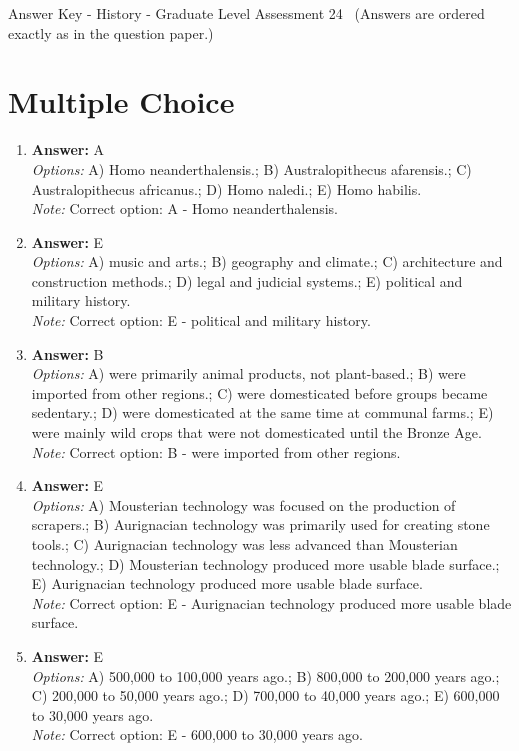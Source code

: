 \documentclass[12pt]{article}
\begin{document}
\begin{center}
Answer Key - History - Graduate Level Assessment 24 \
\small (Answers are ordered exactly as in the question paper.)
\end{center}

\section*{Multiple Choice}
\begin{enumerate}[label=\arabic*.]
\item \textbf{Answer:} A
\\ \textit{Options:} A) Homo neanderthalensis.; B) Australopithecus afarensis.; C) Australopithecus africanus.; D) Homo naledi.; E) Homo habilis.
\\ \textit{Note:} Correct option: A - Homo neanderthalensis.
\item \textbf{Answer:} E
\\ \textit{Options:} A) music and arts.; B) geography and climate.; C) architecture and construction methods.; D) legal and judicial systems.; E) political and military history.
\\ \textit{Note:} Correct option: E - political and military history.
\item \textbf{Answer:} B
\\ \textit{Options:} A) were primarily animal products, not plant-based.; B) were imported from other regions.; C) were domesticated before groups became sedentary.; D) were domesticated at the same time at communal farms.; E) were mainly wild crops that were not domesticated until the Bronze Age.
\\ \textit{Note:} Correct option: B - were imported from other regions.
\item \textbf{Answer:} E
\\ \textit{Options:} A) Mousterian technology was focused on the production of scrapers.; B) Aurignacian technology was primarily used for creating stone tools.; C) Aurignacian technology was less advanced than Mousterian technology.; D) Mousterian technology produced more usable blade surface.; E) Aurignacian technology produced more usable blade surface.
\\ \textit{Note:} Correct option: E - Aurignacian technology produced more usable blade surface.
\item \textbf{Answer:} E
\\ \textit{Options:} A) 500,000 to 100,000 years ago.; B) 800,000 to 200,000 years ago.; C) 200,000 to 50,000 years ago.; D) 700,000 to 40,000 years ago.; E) 600,000 to 30,000 years ago.
\\ \textit{Note:} Correct option: E - 600,000 to 30,000 years ago.
\end{enumerate}
\end{document}

